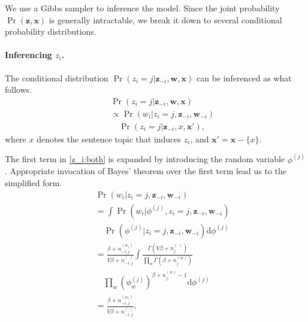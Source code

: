 We use a Gibbs sampler to inference the model.  Since the joint probability
$\Pr(\mathbf{z}, \mathbf{x})$ is generally intractable, we break it down to
several conditional probability distributions. 

\paragraph{Inferencing $z_i$.}  The conditional distribution $\Pr(z_i = j|\mathbf{z}_{-i}, \mathbf{w}, \mathbf{x})$ can
be inferenced as what follows.
\begin{eqnarray}
  && \Pr(z_i = j|\mathbf{z}_{-i}, \mathbf{w}, \mathbf{x}) \nonumber\\
  && \propto \Pr(w_i|z_i = j, \mathbf{z}_{-i}, \mathbf{w}_{-i}) \nonumber\\
  && \quad \Pr(z_i = j|\mathbf{z}_{-i}, x, \mathbf{x}'), \label{z_i:both}
\end{eqnarray}
where $x$ denotes the sentence topic that induces $z_i$, and $\mathbf{x}' = \mathbf{x} - \{ x \}$.  


The first term in \eqref{z_i:both} is expanded by introducing the random variable $\phi^{(j)}$.
Appropriate invocation of Bayes' theorem over the first term lead us to the simplified form.
\begin{eqnarray}
  && \Pr(w_i|z_i = j, \mathbf{z}_{-i}, \mathbf{w}_{-i}) \nonumber \\
  && = \int \Pr(w_i|\phi^{(j)},z_i = j,\mathbf{z}_{-i},\mathbf{w}_{-i}) \nonumber\\
  && \quad \Pr(\phi^{(j)}|z_i = j,\mathbf{z}_{-i},\mathbf{w}_{-i})\mathrm{d}\phi^{(j)} \nonumber \\
  && = \frac{\beta + n_{-i,j}^{(w_i)}}{V \beta + n_{-i,j}^{(\cdot)}} \int \frac{\Gamma(V \beta + n_j^{(\cdot)})}{\prod_w \Gamma(\beta + n_j^{(w)})} \nonumber\\
  && \quad \prod_w \left(\phi^{(j)}_w\right)^{\beta + n_j^{(w)} - 1} \mathrm{d}\phi^{(j)} \label{z_i:1.2} \\
  && = \frac{\beta + n_{-i,j}^{(w_i)}}{V \beta + n_{-i,j}^{(\cdot)}}, \label{z_i:1.3}
\end{eqnarray}

